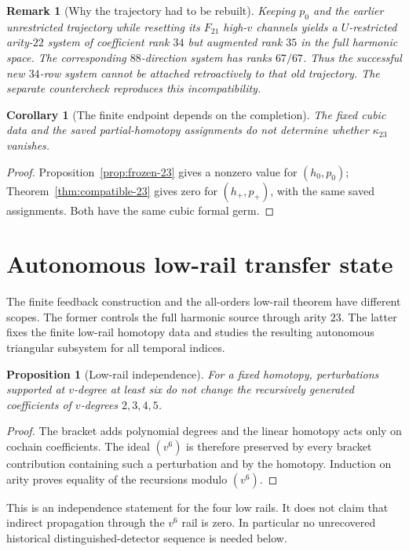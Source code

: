 \documentclass[11pt]{amsart}
\newtheorem{proposition}[theorem]{Proposition}
\newtheorem{corollary}[theorem]{Corollary}
\newtheorem{remark}[theorem]{Remark}
\begin{document}
\begin{remark}[Why the trajectory had to be rebuilt]\label{rem:feedback-compatibility}
Keeping $p_0$ and the earlier unrestricted trajectory while resetting its
$F_{21}$ high-$v$ channels yields a $U$-restricted arity-$22$ system of
coefficient rank $34$ but augmented rank $35$ in the full harmonic space.
The corresponding $88$-direction system has ranks $67/67$.
Thus the successful new $34$-row system cannot be attached retroactively to
that old trajectory. The separate countercheck reproduces this incompatibility.
\end{remark}

\begin{corollary}[The finite endpoint depends on the completion]
The fixed cubic data and the saved partial-homotopy assignments do not determine
whether $\kappa_{23}$ vanishes.
\end{corollary}
\begin{proof}
Proposition~\ref{prop:frozen-23} gives a nonzero value for $(h_0,p_0)$;
Theorem~\ref{thm:compatible-23} gives zero for $(h_+,p_+)$, with the same
saved assignments. Both have the same cubic formal germ.
\end{proof}

\section{Autonomous low-rail transfer state}\label{sec:low-rail}

The finite feedback construction and the all-orders low-rail theorem have
different scopes. The former controls the full harmonic source through
arity $23$. The latter fixes the finite low-rail homotopy data and studies
the resulting autonomous triangular subsystem for all temporal indices.

\begin{proposition}[Low-rail independence]\label{prop:controller-terminality}
For a fixed homotopy, perturbations supported at $v$-degree at least six do
not change the recursively generated coefficients of $v$-degrees $2,3,4,5$.
\end{proposition}
\begin{proof}
The bracket adds polynomial degrees and the linear homotopy acts only on
cochain coefficients. The ideal $(v^6)$ is therefore preserved by every
bracket contribution containing such a perturbation and by the homotopy.
Induction on arity proves equality of the recursions modulo $(v^6)$.
\end{proof}
This is an independence statement for the four low rails. It does not claim
that indirect propagation through the $v^6$ rail is zero. In particular no
unrecovered historical distinguished-detector sequence is needed below.
\end{document}
